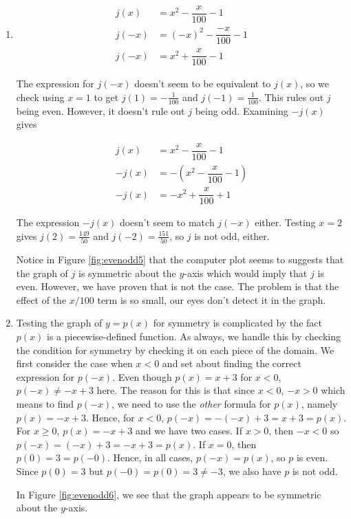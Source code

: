 {\begin{enumerate}

\item  \begin{align*}
j(x) & =  x^2 - \dfrac{x}{100} - 1 \\[3pt]
j(-x) & =  (-x)^2 - \dfrac{-x}{100} - 1 \\[3pt]
j(-x) & =  x^2 + \dfrac{x}{100} - 1 
\end{align*}

The expression for $j(-x)$ doesn't seem to be equivalent to $j(x)$, so we check using $x = 1$ to get $j(1) = -\frac{1}{100}$ and $j(-1) = \frac{1}{100}$.  This rules out $j$ being even.  However, it doesn't rule out $j$ being odd.  Examining $-j(x)$ gives

\begin{align*}
j(x) & =  x^2 - \dfrac{x}{100} - 1 \\[3pt]
-j(x) & =  -\left(x^2 - \dfrac{x}{100} - 1\right) \\[3pt]
-j(x) & =  -x^2 + \dfrac{x}{100} + 1
\end{align*}

The expression $-j(x)$ doesn't seem to match $j(-x)$ either.  Testing $x = 2$ gives $j(2) = \frac{149}{50}$ and $j(-2) = \frac{151}{50}$, so $j$ is not odd, either. 


Notice in Figure \ref{fig:evenodd5} that the computer plot seems to suggests that the graph of $j$ is symmetric about the $y$-axis which would imply that $j$ is even. However, we have proven that is not the case.  The problem is that the effect of the $x/100$ term is so small, our eyes don't detect it in the graph.


\item Testing the graph of $y=p(x)$ for symmetry is complicated by the fact $p(x)$ is a piecewise-defined function.  As always, we handle this by checking the condition for symmetry by checking it on each piece of the domain.  We first consider the case when $x < 0$ and set about finding the correct expression for $p(-x)$.  Even though $p(x) = x+3$ for $x < 0$, $p(-x) \neq -x + 3$ here. The reason for this is that since $x < 0$, $-x > 0$ which means to find $p(-x)$, we need to use the \textit{other} formula for $p(x)$, namely $p(x) = -x+3$. Hence, for $x < 0$, $p(-x) = -(-x)+3 = x+3 = p(x)$.   For $x \geq 0$, $p(x) = -x+3$ and we have two cases.  If $x > 0$, then $-x < 0$ so $p(-x) = (-x)+3 = -x+3 = p(x)$.  If $x = 0$, then $p(0) = 3 = p(-0)$.  Hence, in all cases, $p(-x) = p(x)$, so $p$ is even. Since $p(0) = 3$ but $p(-0) = p(0) = 3 \neq -3$, we also have $p$ is not odd.  

 
In Figure \ref{fig:evenodd6}, we see that the graph appears to be symmetric about the $y$-axis. 

\end{enumerate}
}

